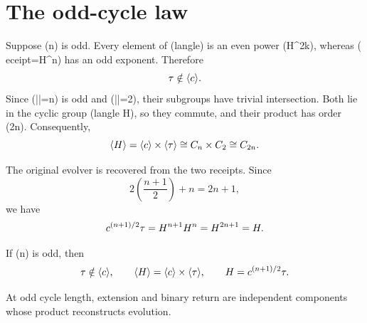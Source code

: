 \section{The odd-cycle law}

Suppose (n) is odd. Every element of (langle\comm\rangle) is an even
power (H^{2k}), whereas (
eceipt=H^n) has an odd exponent. Therefore
\[
\tau\notin\langle c\rangle.
\]
Since (|\comm|=n) is odd and (|\receipt|=2), their subgroups have trivial
intersection. Both lie in the cyclic group (langle H\rangle), so they
commute, and their product has order (2n). Consequently,
\[
\langle H\rangle
=\langle c\rangle\times\langle\tau\rangle
\cong C_n\times C_2
\cong C_{2n}.
\]

The original evolver is recovered from the two receipts. Since
\[
2\left(\frac{n+1}{2}\right)+n=2n+1,
\]
we have
\[
c^{(n+1)/2}\tau
=H^{n+1}H^n
=H^{2n+1}
=H.
\]

\begin{proposition}
If (n) is odd, then
\[
\tau\notin\langle c\rangle,
\qquad
\langle H\rangle
=\langle c\rangle\times\langle\tau\rangle,
\qquad
H=c^{(n+1)/2}\tau.
\]
\end{proposition}

At odd cycle length, extension and binary return are independent components
whose product reconstructs evolution.

